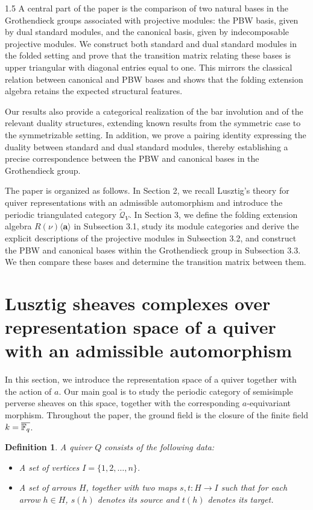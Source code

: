 \documentclass[10pt]{amsart}
\newtheorem{definition}[theorem]{Definition}
\begin{document}
\begin{spacing}{1.5}
A central part of the paper is the comparison of two natural bases in the Grothendieck groups associated with projective modules: the PBW basis, given by dual standard modules, and the canonical basis, given by indecomposable projective modules. We construct both standard and dual standard modules in the folded setting and prove that the transition matrix relating these bases is upper triangular with diagonal entries equal to one. This mirrors the classical relation between canonical and PBW bases and shows that the folding extension algebra retains the expected structural features.

Our results also provide a categorical realization of the bar involution and of the relevant duality structures, extending known results from the symmetric case to the symmetrizable setting. In addition, we prove a pairing identity expressing the duality between standard and dual standard modules, thereby establishing a precise correspondence between the PBW and canonical bases in the Grothendieck group.

The paper is organized as follows. In Section 2, we recall Lusztig's theory for quiver representations with an admissible automorphism and introduce the periodic triangulated category $\widetilde{\mathcal{Q}}_V$. In Section 3, we define the folding extension algebra $R(\nu)\langle\mathbf{a}\rangle$ in Subsection 3.1, study its module categories and derive the explicit descriptions of the projective modules in Subsection 3.2, and construct the PBW and canonical bases within the Grothendieck group in Subsection 3.3. We then compare these bases and determine the transition matrix between them.

\section{Lusztig sheaves complexes over representation space of a quiver with an admissible automorphism}
In this section, we introduce the representation space of a quiver together with the action of $a$. Our main goal is to study the periodic category of semisimple perverse sheaves on this space, together with the corresponding $a$-equivariant morphism. Throughout the paper, the ground field is the closure of the finite field $k=\overline{{\mathbb F}_q}$.

\begin{definition}
A quiver $Q$ consists of the following data:
\begin{itemize}
    \item A set of vertices $I = \{1,2,\ldots,n\}$.
    \item A set of arrows $H$, together with two maps $s, t : H \to I$ such that for each arrow $h \in H$, $s(h)$ denotes its source and $t(h)$ denotes its target.
\end{itemize}
\end{definition}


\end{spacing}
\end{document}
